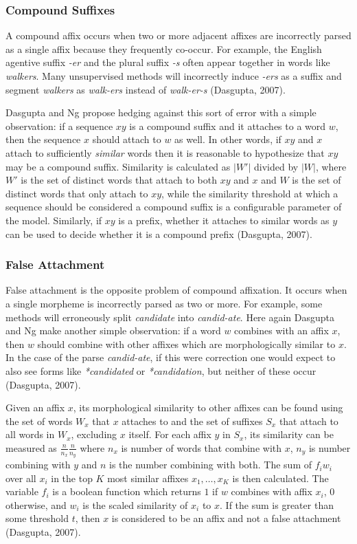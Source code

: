 \documentclass[12pt]{article}
\begin{document}
\subsubsection{Compound Suffixes}
A compound affix occurs when two or more adjacent affixes are incorrectly parsed as a single affix because they frequently co-occur. For example, the English agentive suffix \textit{-er} and the plural suffix \textit{-s} often appear together in words like \textit{walkers}. Many unsupervised methods will incorrectly induce \textit{-ers} as a suffix and segment \textit{walkers} as \textit{walk-ers} instead of \textit{walk-er-s} (Dasgupta, 2007).

Dasgupta and Ng propose hedging against this sort of error with a simple observation: if a sequence $xy$ is a compound suffix and it attaches to a word $w$, then the sequence $x$ should attach to $w$ as well. In other words, if $xy$ and $x$ attach to sufficiently \emph{similar} words then it is reasonable to hypothesize that $xy$ may be a compound suffix. Similarity is calculated as $\vert W' \vert$ divided by $\vert W \vert$, where $W'$ is the set of distinct words that attach to both $xy$ and $x$ and $W$ is the set of distinct words that only attach to $xy$, while the similarity threshold at which a sequence should be considered a compound suffix is a configurable parameter of the model. Similarly, if $xy$ is a prefix, whether it attaches to similar words as $y$ can be used to decide whether it is a compound prefix (Dasgupta, 2007).

\subsubsection{False Attachment}
False attachment is the opposite problem of compound affixation. It occurs when a single morpheme is incorrectly parsed as two or more. For example, some methods will erroneously split \textit{candidate} into \textit{candid-ate}. Here again Dasgupta and Ng make another simple observation: if a word $w$ combines with an affix $x$, then $w$ should combine with other affixes which are morphologically similar to $x$. In the case of the parse \textit{candid-ate}, if this were correction one would expect to also see forms like \textit{*candidated} or \textit{*candidation}, but neither of these occur (Dasgupta, 2007).

Given an affix $x$, its morphological similarity to other affixes can be found using the set of words $W_x$ that $x$ attaches to and the set of suffixes $S_x$ that attach to all words in $W_x$, excluding $x$ itself. For each affix $y$ in $S_x$, its similarity can be measured as $\frac{n}{n_x}\frac{n}{n_y}$ where $n_x$ is number of words that combine with $x$, $n_y$ is number combining with $y$ and $n$ is the number combining with both. The sum of $f_i w_i$ over all $x_i$ in the top $K$ most similar affixes $x_1,\dots,x_K$ is then calculated. The variable $f_i$ is a boolean function which returns $1$ if $w$ combines with affix $x_i$, $0$ otherwise, and $w_i$ is the scaled similarity of $x_i$ to $x$. If the sum is greater than some threshold $t$, then $x$ is considered to be an affix and not a false attachment (Dasgupta, 2007).
\end{document}

